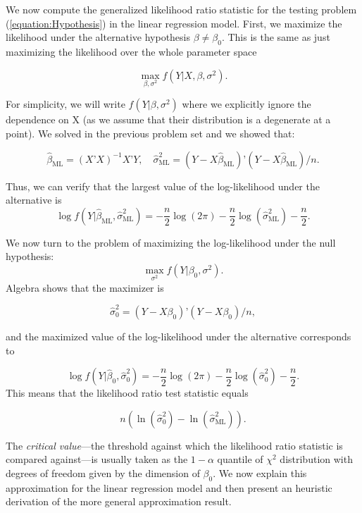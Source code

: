 \documentclass[11pt]{article} %
\begin{document}
 We now compute the generalized likelihood ratio statistic for the testing problem (\ref{equation:Hypothesis}) in the linear regression model. First, we maximize the likelihood under the alternative hypothesis $\beta \neq \beta_0$. This is the same as just maximizing the likelihood over the whole parameter space

\[  \max_{\beta, \sigma^2} f(Y | X, \beta , \sigma^2). \] 

\noindent For simplicity, we will write $f(Y| \beta, \sigma^2)$ where we explicitly ignore the dependence on X (as we assume that their distribution is a degenerate at a point). We solved in the previous problem set and we showed that:

\[ \widehat{\beta}_{\textrm{ML}} = (X’X)^{-1}X’Y, \quad \widehat{\sigma}^2_{\textrm{ML}} = (Y-X\widehat{\beta}_{\textrm{ML}})’(Y-X\widehat{\beta}_{\textrm{ML}})/n. \] 

\noindent Thus, we can verify that the largest value of the log-likelihood under the alternative is
\[ \log f(Y | \widehat{\beta}_{\textrm{ML}}, \widehat{\sigma}^2_{\textrm{ML}}) = - \frac{n}{2} \log(2 \pi ) - \frac{n}{2} \log( \widehat{\sigma}^2_{\textrm{ML}}) - \frac{n}{2}. \]

\noindent We now turn to the problem of maximizing the log-likelihood under the null hypothesis:
\[ \max_{\sigma^2} f(Y | \beta_0 , \sigma^2). \]
Algebra shows that the maximizer is

\[\widehat{\sigma}^2_{0} = (Y-X\beta_0)’(Y-X \beta_0)/n,\]

\noindent and the maximized value of the log-likelihood under the alternative corresponds to

\[ \log f(Y | \widehat{\beta}_{0}, \widehat{\sigma}^2_{0}) = - \frac{n}{2} \log(2 \pi ) - \frac{n}{2} \log( \widehat{\sigma}^2_{0}) - \frac{n}{2}. \]
\noindent This means that the likelihood ratio test statistic equals

\begin{equation} \label{equation:GLR}
n  \left( \ln ( \widehat{\sigma}^2_{0} ) -\ln( \widehat{\sigma}^2_{\textrm{ML}} ) \right). 
\end{equation}

The \emph{critical value}---the threshold against which the likelihood ratio statistic is compared against---is usually taken as the $1-\alpha$ quantile of $\chi^2$ distribution with degrees of freedom given by the dimension of $\beta_0$. We now explain this approximation for the linear regression model and then present an heuristic derivation of the more general approximation result. 
\end{document}
